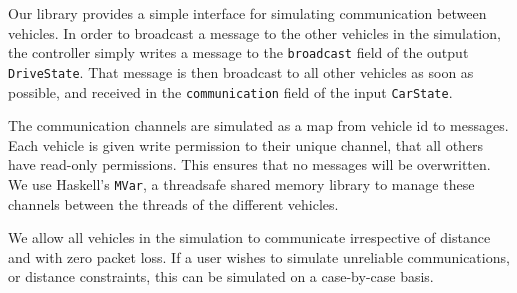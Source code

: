 Our library provides a simple interface for simulating communication between vehicles.
In order to broadcast a message to the other vehicles in the simulation, the controller simply writes a message to the \texttt{broadcast} field of the output \texttt{DriveState}.
That message is then broadcast to all other vehicles as soon as possible, and received in the \texttt{communication} field of the input \texttt{CarState}.

The communication channels are simulated as a map from vehicle id to messages.
Each vehicle is given write permission to their unique channel, that all others have read-only permissions.
This ensures that no messages will be overwritten.
We use Haskell's \texttt{MVar}, a threadsafe shared memory library to manage these channels between the threads of the different vehicles.

We allow all vehicles in the simulation to communicate irrespective of distance and with zero packet loss.
If a user wishes to simulate unreliable communications, or distance constraints, this can be simulated on a case-by-case basis.

